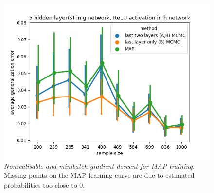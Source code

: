 \documentclass[11pt]{article}
\DeclareMathOperator*{\E}{\operatorname{\mathbb{E}}}
\numberwithin{equation}{section}
\theoremstyle{plain}
\theoremstyle{definition}
\begin{document}
\begin{figure}[t!]
\begin{center}
		\includegraphics[scale=0.45]{taskid7.png}
	\end{center}
	\caption{\textit{Nonrealisable and minibatch gradient descent for MAP training.} Missing points on the MAP learning curve are due to estimated probabilities too close to 0.}
	\label{fig:avg_gen_err_minibatch_nonrealisable}
\end{figure}


\begin{table}[h!]%

	\caption{Companion to Figure \ref{fig:avg_gen_err_minibatch_nonrealisable}. The learning coefficient is the slope of the linear fit $1/n$ versus $\E_n G(n)$ (with intercept since nonrealisable).}%
	\label{table::avg_gen_err_minibatch_nonrealisable}%
	\begin{tiny}
		\begin{subtable}[t]{.5\linewidth}
			\caption{1 hidden layer(s) in $g$, identity activation in $h$}		
		\end{subtable}
		\hspace{2em}
		\begin{subtable}[t]{.5\linewidth}
			\caption{5 hidden layer(s) in $g$, identity activation in $h$}		
		\end{subtable}

		\begin{subtable}[t]{.5\linewidth}
			\caption{1 hidden layer(s) in $g$, ReLU activation in $h$}		
		\end{subtable}
		\hspace{2em}
		\begin{subtable}[t]{.5\linewidth}
			\caption{5 hidden layer(s) in $g$, ReLU activation in $h$}		
		\end{subtable}
	\end{tiny}
\end{table}
\end{document}
